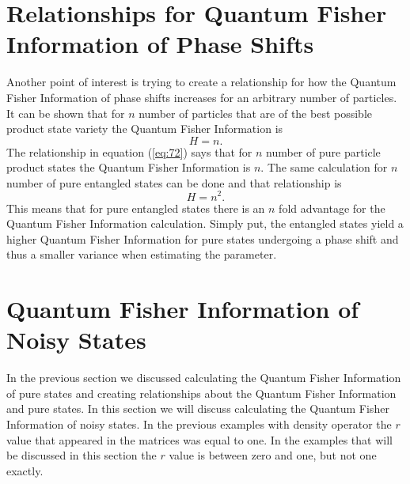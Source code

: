 \documentclass[twocolumn]{article}
\begin{document}
\section*{Relationships for Quantum Fisher Information of Phase Shifts}
Another point of interest is trying to create a relationship for how the Quantum Fisher Information of phase shifts increases for an arbitrary number of particles. It can be shown that for $n$ number of particles that are of the best possible product state variety the Quantum Fisher Information is
\begin{equation} \label{eq:72}
H=n.
\end{equation}
The relationship in equation (\ref{eq:72}) says that for $n$ number of pure particle product states the Quantum Fisher Information is $n$. The same calculation for $n$ number of pure entangled states can be done and that relationship is
\begin{equation} \label{eq:73}
H=n^2.
\end{equation}
This means that for pure entangled states there is an $n$ fold advantage for the Quantum Fisher Information calculation. Simply put, the entangled states yield a higher Quantum Fisher Information for pure states undergoing a phase shift and thus a smaller variance when estimating the parameter.
\section*{Quantum Fisher Information of Noisy States}
In the previous section we discussed calculating the Quantum Fisher Information of pure states and creating relationships about the Quantum Fisher Information and pure states. In this section we will discuss calculating the Quantum Fisher Information of noisy states. In the previous examples with density operator the $r$ value that appeared in the matrices was equal to one. In the examples that will be discussed in this section the $r$ value is between zero and one, but not one exactly.
\end{document}
